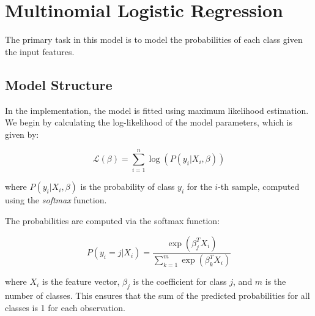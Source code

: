 \documentclass[fleqn,moreauthors,10pt]{ds_report}
\begin{document}
%
\raggedbottom

\maketitle

\thispagestyle{empty} 



\section{Multinomial Logistic Regression}
The primary task in this model is to model the probabilities of each class given the input features.

\subsection{Model Structure}
In the implementation, the model is fitted using maximum likelihood estimation. We begin by calculating the log-likelihood of the model parameters, which is given by:

\[
\mathcal{L}(\beta) = \sum_{i=1}^{n} \log(P(y_i|X_i, \beta))
\]

where \(P(y_i|X_i, \beta)\) is the probability of class \(y_i\) for the \(i\)-th sample, computed using the \textit{softmax} function.

The probabilities are computed via the softmax function:

\[
P(y_i = j | X_i) = \frac{\exp(\beta_j^T X_i)}{\sum_{k=1}^m \exp(\beta_k^T X_i)}
\]

where \(X_i\) is the feature vector, \(\beta_j\) is the coefficient for class \(j\), and \(m\) is the number of classes. This ensures that the sum of the predicted probabilities for all classes is 1 for each observation.
\end{document}
